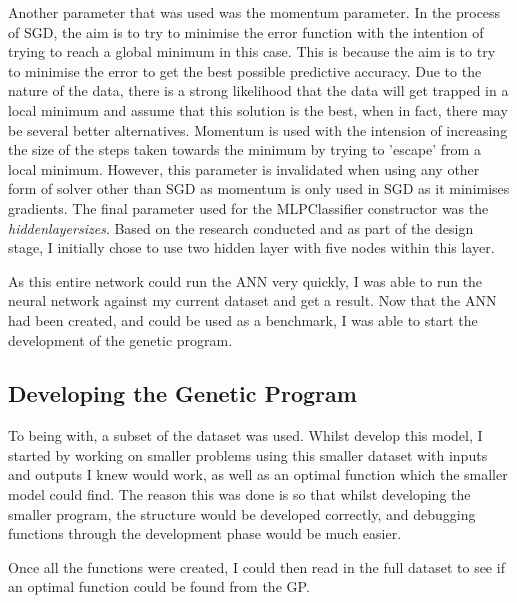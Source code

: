 \documentclass[11pt]{article}
\begin{document}
Another parameter that was used was the momentum parameter. In the process of SGD, the aim is to try to minimise the error function with the intention of trying to reach a global minimum in this case. This is because the aim is to try to minimise the error to get the best possible predictive accuracy. Due to the nature of the data, there is a strong likelihood that the data will get trapped in a local minimum and assume that this solution is the best, when in fact, there may be several better alternatives. Momentum is used with the intension of increasing the size of the steps taken towards the minimum by trying to 'escape' from a local minimum. However, this parameter is invalidated when using any other form of solver other than SGD as momentum is only used in SGD as it minimises gradients. The final parameter used for the MLPClassifier constructor was the \textit{hidden\textunderscore layer\textunderscore sizes}. Based on the research conducted and as part of the design stage, I initially chose to use two hidden layer with five nodes within this layer. 

As this entire network could run the ANN very quickly, I was able to run the neural network against my current dataset and get a result. Now that the ANN had been created, and could be used as a benchmark, I was able to start the development of the genetic program.

\subsection{Developing the Genetic Program}

To being with, a subset of the dataset was used. Whilst develop this model, I started by working on smaller problems using this smaller dataset with inputs and outputs I knew would work, as well as an optimal function which the smaller model could find. The reason this was done is so that whilst developing the smaller program, the structure would be developed correctly, and debugging functions through the development phase would be much easier. 

Once all the functions were created, I could then read in the full dataset to see if an optimal function could be found from the GP. 
\end{document}
